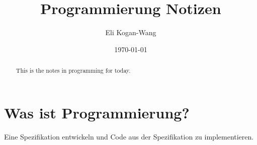 \documentclass[a4paper,12pt]{article}
\title{Programmierung Notizen}
\author{Eli Kogan-Wang}
\date{\today}
\begin{document}
\renewcommand{\abstractname}{Abstract}
\begin{abstract}
  This is the notes in programming for today.
\end{abstract}
\section*{Was ist Programmierung?}

Eine Spezifikation entwickeln und Code aus der Spezifikation zu implementieren.
\end{document}
